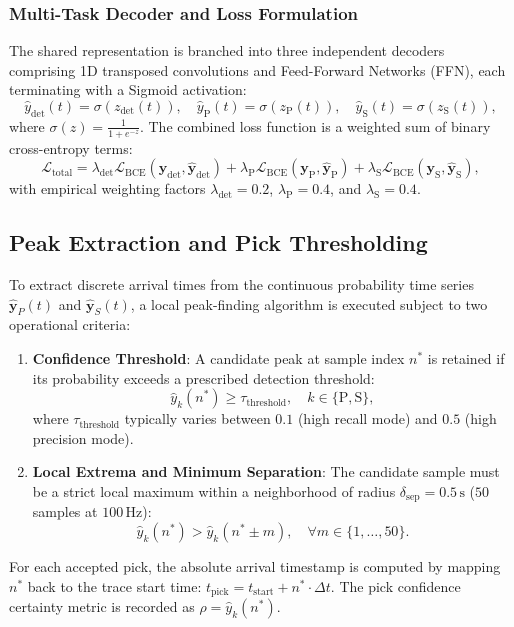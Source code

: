 \subsubsection{Multi-Task Decoder and Loss Formulation}
The shared representation is branched into three independent decoders comprising 1D transposed convolutions and Feed-Forward Networks (FFN), each terminating with a Sigmoid activation:
\begin{equation}
  \hat{y}_{\mathrm{det}}(t) = \sigma\left(z_{\mathrm{det}}(t)\right), \quad \hat{y}_{\mathrm{P}}(t) = \sigma\left(z_{\mathrm{P}}(t)\right), \quad \hat{y}_{\mathrm{S}}(t) = \sigma\left(z_{\mathrm{S}}(t)\right),
\end{equation}
where $\sigma(z) = \frac{1}{1 + e^{-z}}$. The combined loss function is a weighted sum of binary cross-entropy terms:
\begin{equation}
  \mathcal{L}_{\mathrm{total}} = \lambda_{\mathrm{det}} \mathcal{L}_{\mathrm{BCE}}(\mathbf{y}_{\mathrm{det}}, \hat{\mathbf{y}}_{\mathrm{det}}) + \lambda_{\mathrm{P}} \mathcal{L}_{\mathrm{BCE}}(\mathbf{y}_{\mathrm{P}}, \hat{\mathbf{y}}_{\mathrm{P}}) + \lambda_{\mathrm{S}} \mathcal{L}_{\mathrm{BCE}}(\mathbf{y}_{\mathrm{S}}, \hat{\mathbf{y}}_{\mathrm{S}}),
\end{equation}
with empirical weighting factors $\lambda_{\mathrm{det}} = 0.2$, $\lambda_{\mathrm{P}} = 0.4$, and $\lambda_{\mathrm{S}} = 0.4$.

\subsection{Peak Extraction and Pick Thresholding}
To extract discrete arrival times from the continuous probability time series $\hat{\mathbf{y}}_P(t)$ and $\hat{\mathbf{y}}_S(t)$, a local peak-finding algorithm is executed subject to two operational criteria:
\begin{enumerate}
  \item \textbf{Confidence Threshold}: A candidate peak at sample index $n^*$ is retained if its probability exceeds a prescribed detection threshold:
  \begin{equation}
    \hat{y}_k(n^*) \ge \tau_{\mathrm{threshold}}, \quad k \in \{\mathrm{P}, \mathrm{S}\},
  \end{equation}
  where $\tau_{\mathrm{threshold}}$ typically varies between $0.1$ (high recall mode) and $0.5$ (high precision mode).
  \item \textbf{Local Extrema and Minimum Separation}: The candidate sample must be a strict local maximum within a neighborhood of radius $\delta_{\mathrm{sep}} = 0.5\,\mathrm{s}$ ($50$ samples at $100\,\mathrm{Hz}$):
  \begin{equation}
    \hat{y}_k(n^*) > \hat{y}_k(n^* \pm m), \quad \forall m \in \{1, \dots, 50\}.
  \end{equation}
\end{enumerate}
For each accepted pick, the absolute arrival timestamp is computed by mapping $n^*$ back to the trace start time: $t_{\mathrm{pick}} = t_{\mathrm{start}} + n^* \cdot \Delta t$. The pick confidence certainty metric is recorded as $\rho = \hat{y}_k(n^*)$.

